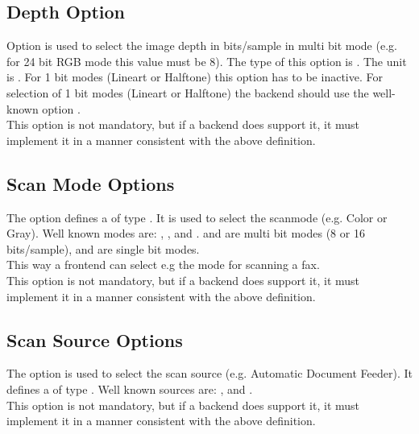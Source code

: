 \documentclass[11pt,DVIps]{report}
\begin{document}
\begin{changebar}
\subsection{Depth Option}
Option  is used to select the image depth in bits/sample
in multi bit mode (e.g. for 24 bit RGB mode this value must be 8).
The type of this option is .
The unit is . For 1 bit modes
(Lineart or Halftone) this option has to be inactive.
For selection of 1 bit modes (Lineart or Halftone) the
backend should use the well-known option .\\
 
This option is not mandatory, but if a backend does support it, it
must implement it in a manner consistent with the above definition.\\
\end{changebar}
 
\begin{changebar}
\subsection{Scan Mode Options}
The option  defines a 
of type .
It is used to select the scanmode (e.g. Color or Gray).
Well known modes are: , , 
and .  and  are multi bit
modes (8 or 16 bits/sample),  and 
are single bit modes.\\
This way a frontend can select e.g the mode 
for scanning a fax.\\
 
This option is not mandatory, but if a backend does support it, it
must implement it in a manner consistent with the above definition.\\
\end{changebar}
 
\begin{changebar}
\subsection{Scan Source Options}
The option  is used to select the scan source
(e.g. Automatic Document Feeder).
It defines a 
of type .
Well known sources are: ,  and
.\\
 
This option is not mandatory, but if a backend does support it, it
must implement it in a manner consistent with the above definition.\\
\end{changebar}
\end{document}
